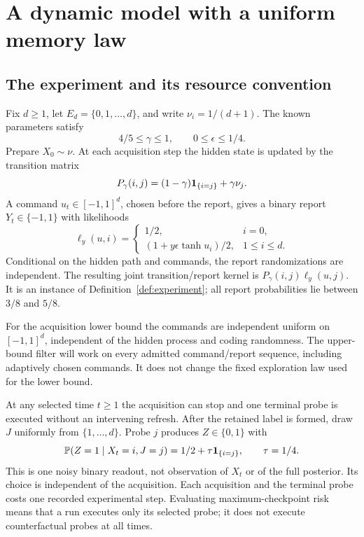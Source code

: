 \section{A dynamic model with a uniform memory law}\label{sec:refreshing}
\subsection{The experiment and its resource convention}
Fix $d\ge1$, let $E_d=\{0,1,\ldots,d\}$, and write
$\nu_i=1/(d+1)$. The known parameters satisfy
\begin{equation}\label{eq:refresh-range}
 4/5\le\gamma\le1,\qquad 0\le\epsilon\le1/4.
\end{equation}
Prepare $X_0\sim\nu$. At each acquisition step the hidden state is updated
by the transition matrix
\begin{equation}\label{eq:refresh-transition}
 P_\gamma(i,j)=(1-\gamma)\mathbf 1_{\{i=j\}}+\gamma\nu_j.
\end{equation}
A command $u_t\in[-1,1]^d$, chosen before the report, gives a binary report
$Y_t\in\{-1,1\}$ with likelihoods
\begin{equation}\label{eq:refresh-likelihood}
 \ell_y(u,i)=\begin{cases}
 1/2,&i=0,\\
 (1+y\epsilon\tanh u_i)/2,&1\le i\le d.
 \end{cases}
\end{equation}
Conditional on the hidden path and commands, the report randomizations are
independent. The resulting joint transition/report kernel is
$P_\gamma(i,j)\ell_y(u,j)$. It is an instance of
Definition~\ref{def:experiment}; all report probabilities lie between
$3/8$ and $5/8$.

For the acquisition lower bound the commands are independent uniform on
$[-1,1]^d$, independent of the hidden process and coding randomness. The
upper-bound filter will work on every admitted command/report sequence,
including adaptively chosen commands. It does not change the fixed
exploration law used for the lower bound.

At any selected time $t\ge1$ the acquisition can stop and one terminal
probe is executed without an intervening refresh. After the retained label
is formed, draw $J$ uniformly from $\{1,\ldots,d\}$. Probe $j$ produces
$Z\in\{0,1\}$ with
\begin{equation}\label{eq:refresh-probe}
 \mathbb P(Z=1\mid X_t=i,J=j)=1/2+\tau\mathbf 1_{\{i=j\}},
 \qquad \tau=1/4.
\end{equation}
This is one noisy binary readout, not observation of $X_t$ or of the full
posterior. Its choice is independent of the acquisition. Each acquisition
and the terminal probe costs one recorded experimental step. Evaluating
maximum-checkpoint risk means that a run executes only its selected probe;
it does not execute counterfactual probes at all times.

